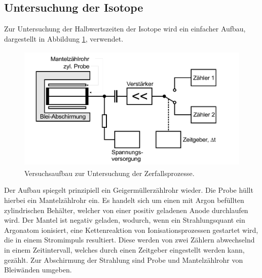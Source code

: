 \subsection{Untersuchung der Isotope}
Zur Untersuchung der Halbwertszeiten der Isotope wird ein einfacher Aufbau, dargestellt in Abbildung \ref{abb:2}, verwendet.
\begin{figure}[H]
  \centering
  \includegraphics[height=6cm]{ressources/aufbau.png}
  \caption{Versuchsaufbau zur Untersuchung der Zerfallsprozesse. \cite{skript}}
  \label{abb:2}
\end{figure}
Der Aufbau spiegelt prinzipiell ein Geigermüllerzählrohr wieder.
Die Probe hüllt hierbei ein Mantelzählrohr ein.
Es handelt sich um einen mit Argon befüllten zylindrischen Behälter, welcher von einer positiv geladenen Anode durchlaufen wird.
Der Mantel ist negativ geladen, wodurch, wenn ein Strahlungsquant ein Argonatom ionisiert, eine Kettenreaktion von Ionisationsprozessen gestartet wird, die in einem Stromimpuls resultiert.
Diese werden von zwei Zählern abwechselnd in einem Zeitintervall, welches durch einen Zeitgeber eingestellt werden kann, gezählt.
Zur Abschirmung der Strahlung sind Probe und Mantelzählrohr von Bleiwänden umgeben.

